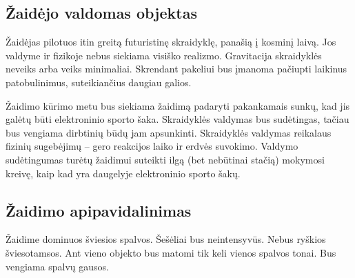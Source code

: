 \subsection{Žaidėjo valdomas objektas}

Žaidėjas pilotuos itin greitą futuristinę skraidyklę, panašią į kosminį laivą.
Jos valdyme ir fizikoje nebus siekiama visiško realizmo.
Gravitacija skraidyklės neveiks arba veiks minimaliai.
Skrendant pakeliui bus įmanoma pačiupti laikinus patobulinimus, suteikiančius daugiau galios.

Žaidimo kūrimo metu bus siekiama žaidimą padaryti pakankamais sunkų, kad jis galėtų būti elektroninio sporto šaka.
Skraidyklės valdymas bus sudėtingas, tačiau bus vengiama dirbtinių būdų jam apsunkinti.
Skraidyklės valdymas reikalaus fizinių sugebėjimų -- gero reakcijos laiko ir erdvės suvokimo.
Valdymo sudėtingumas turėtų žaidimui suteikti ilgą (bet nebūtinai stačią) mokymosi kreivę, kaip kad yra daugelyje elektroninio sporto šakų.

\subsection{Žaidimo apipavidalinimas}

Žaidime dominuos šviesios spalvos.
Šešėliai bus neintensyvūs.
Nebus ryškios šviesotamsos.
Ant vieno objekto bus matomi tik keli vienos spalvos tonai.
Bus vengiama spalvų gausos.
